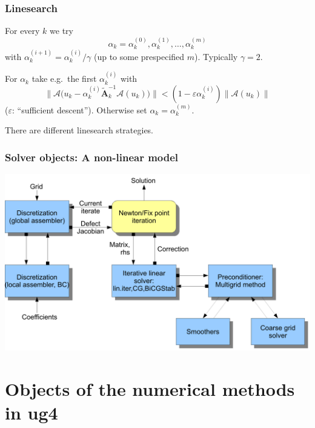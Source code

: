 \documentclass[xcolor=dvipsnames]{beamer}
\begin{document}
\begin{frame} [t]
\frametitle {Linesearch}
For every $k$ we try
$$
 \alpha_k = \alpha_k^{(0)}, \alpha_k^{(1)}, \dots, \alpha_k^{(m)}
$$
with $\alpha_k^{(i+1)} = \alpha_k^{(i)} / \gamma$ (up to some prespecified $m$). Typically $\gamma = 2$.

\pause
\vspace{1ex}
For $\alpha_k$ take e.g.\ the first $\alpha_k^{(i)}$ with
$$
 \| \mathcal{A} \bigl ( u_k - \alpha_k^{(i)} \tilde{\mathbf{A}}_k^{-1} \mathcal{A} (u_k) \bigr ) \|
  < (1 - \varepsilon \alpha_k^{(i)}) \| \mathcal{A} (u_k) \|
$$
($\varepsilon$: ``sufficient descent''). Otherwise set $\alpha_k = \alpha_k^{(m)}$.

\pause
\vspace{1ex}
There are different linesearch strategies.
\end{frame}

\begin {frame} [t]
\frametitle {Solver objects: A non-linear model}
\centerline {\includegraphics [width=1.15\textwidth] {StationarySolverFull}}
\end {frame}

\section {Objects of the numerical methods in ug4}
\end{document}
